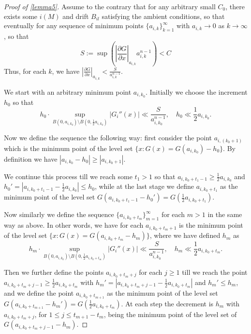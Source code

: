 \documentclass{article}
\newcounter{lem}
\theoremstyle{plain}
\theoremstyle{definition}
\theoremstyle{plain}
\begin{document}
\begin{proof}[Proof of \cref{lemma5}] Assume to the contrary that for any arbitrary small $C_0$, there exists some $i(M)$ and drift $B_{il}$ satisfying
the ambient conditions, so that eventually for any sequence of minimum points $\{a_{i,k}\}_{k=1}^{\infty}$ with $a_{i,k} \to 0$ as $k \to \infty$, so that
$$S := \sup \left( \left| \frac{\partial G}{\partial x} \right|_{a_{i,k}} a_{i,k}^{n-1} \right) < C$$
Thus, for each $k$, we have $\left| \frac{\partial G}{\partial x} \right|_{a_{i,k}} < \frac{S}{a_{i,k}^{n-1}}$.

We start with an arbitrary minimum point $a_{i,k_0}$. Initially we choose the increment $h_0$ so that
$$h_0 \cdot \sup_{B(0, a_{i,k_0}) \setminus B(0, \frac{1}{2} a_{i,k_0})} |G_i''(x)| \ll \frac{S}{a_{i,k_0}^{n-1}}, \quad h_0 \ll \frac{1}{2} a_{i,k_0}.$$

Now we define the sequence the following way: first consider the point $a_{i,(k_0+1)}$ which is the minimum point of the level set $\{x : G(x) = G(a_{i,k_0}) - h_0\}$. By definition we have $|a_{i,k_0} - h_0| \ge |a_{i,k_0+1}|$.

We continue this process till we reach some $t_1 > 1$ so that $a_{i, k_0+t_1-1} \ge \frac{1}{2} a_{i,k_0}$ and $h_0' = |a_{i, k_0+t_1-1} - \frac{1}{2} a_{i,k_0}| \le h_0$, while at the last stage we define $a_{i, k_0+t_1}$ as the minimum point of the level set $G(a_{i, k_0+t_1-1} - h_0') = G(\frac{1}{2} a_{i, k_0+t_1})$.

Now similarly we define the sequence $\{a_{i, k_0+t_m}\}_{m=1}^{\infty}$ for each $m > 1$ in the same way as above. In other words, we have for each $a_{i, k_0+t_m+1}$ is the minimum point of the level set $\{x : G(x) = G(a_{i, k_0+t_m} - h_m)\}$, where we have defined $h_m$ as
$$h_m \cdot \sup_{B(0, a_{i,k_0}) \setminus B(0, \frac{1}{2} a_{i, k_0+t_m})} |G_i''(x)| \ll \frac{S}{a_{i,k_0}^{n-1}}, \quad h_m \ll \frac{1}{2} a_{i, k_0+t_m}.$$

Then we further define the points $a_{i, k_0+t_m+j}$ for each $j \ge 1$ till we reach the point $a_{i, k_0+t_m+j-1} \ge \frac{1}{2} a_{i, k_0+t_m}$ with $h_m' = |a_{i, k_0+t_m+j-1} - \frac{1}{2} a_{i, k_0+t_m}|$ and $h_m' \le h_m$, and we define the point $a_{i, k_0+t_{m+1}}$ as the minimum point of the level set $G(a_{i, k_0+t_{m+1}} - h_m') = G(\frac{1}{2} a_{i, k_0+t_m})$. At each step the decrement is $h_m$ with $a_{i, k_0+t_m+j}$, for $1 \le j \le t_{m+1}-t_m$, being the minimum point of the level set of $G(a_{i, k_0 + t_m + j - 1}- h_m)$.


\end{proof}
\end{document}

